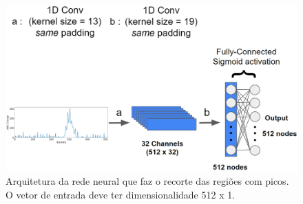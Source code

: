 \documentclass[a4paper,12pt,oneside]{book}
\begin{document}
\begin{figure}[H]
    \centering
    \includegraphics[scale = 0.35]{figs/n_peaks.png}
    \caption{Arquitetura da rede neural que faz o recorte das regiões com picos. O vetor de entrada deve ter dimensionalidade 512 x 1.}
    \label{fig:arq:n_peaks}
\end{figure}
\end{document}
